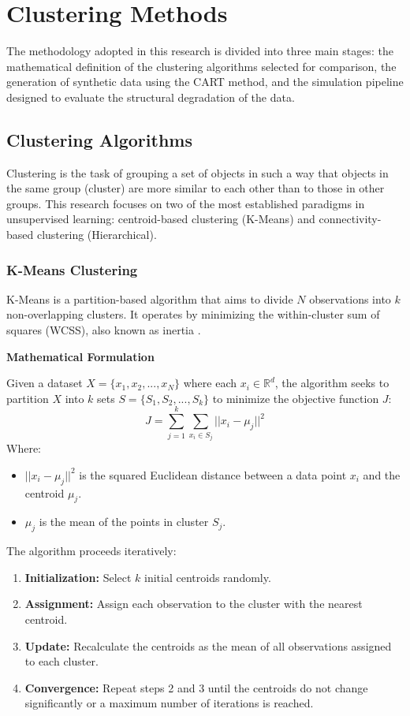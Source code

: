 \chapter{Clustering Methods}
\label{chap:methods}

The methodology adopted in this research is divided into three main stages: the mathematical definition of the clustering algorithms selected for comparison, the generation of synthetic data using the CART method, and the simulation pipeline designed to evaluate the structural degradation of the data.

\section{Clustering Algorithms}
\label{sec:clustering-algorithms}

Clustering is the task of grouping a set of objects in such a way that objects in the same group (cluster) are more similar to each other than to those in other groups. This research focuses on two of the most established paradigms in unsupervised learning: centroid-based clustering (K-Means) and connectivity-based clustering (Hierarchical).

\subsection{K-Means Clustering}
K-Means is a partition-based algorithm that aims to divide $N$ observations into $k$ non-overlapping clusters. It operates by minimizing the within-cluster sum of squares (WCSS), also known as inertia \cite{macqueen1967}.

\textbf{Mathematical Formulation}

Given a dataset $X = \{x_1, x_2, ..., x_N\}$ where each $x_i \in \mathbb{R}^d$, the algorithm seeks to partition $X$ into $k$ sets $S = \{S_1, S_2, ..., S_k\}$ to minimize the objective function $J$:
\begin{equation}
  J = \sum_{j=1}^{k} \sum_{x_i \in S_j} ||x_i - \mu_j||^2
\end{equation}
Where:
\begin{itemize}
  \item $||x_i - \mu_j||^2$ is the squared Euclidean distance between a data point $x_i$ and the centroid $\mu_j$.
  \item $\mu_j$ is the mean of the points in cluster $S_j$.
\end{itemize}

The algorithm proceeds iteratively:
\begin{enumerate}
  \item \textbf{Initialization:} Select $k$ initial centroids randomly.
  \item \textbf{Assignment:} Assign each observation to the cluster with the nearest centroid.
  \item \textbf{Update:} Recalculate the centroids as the mean of all observations assigned to each cluster.
  \item \textbf{Convergence:} Repeat steps 2 and 3 until the centroids do not change significantly or a maximum number of iterations is reached.
\end{enumerate}

